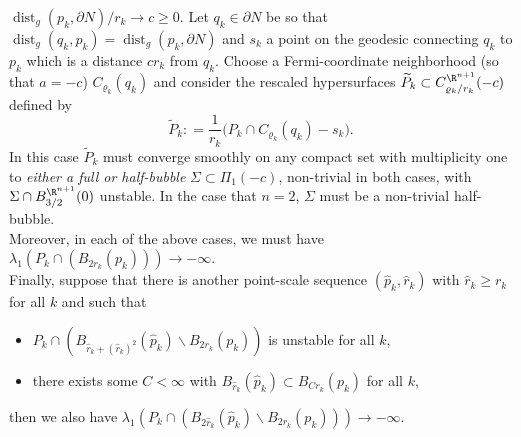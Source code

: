 \begin{thm}
        	 		 $\operatorname{dist}_g(p_k,\partial N)/r_k\to c\geqslant 0$. Let $q_k\in\partial N$ be so that $\operatorname{dist}_g(q_k,p_k)=\operatorname{dist}_g(p_k,\partial N)$ and $s_k$ a point on the geodesic connecting $q_k$ to $p_k$ which is a distance $cr_k$ from $q_k$. Choose a Fermi-coordinate neighborhood (so that $a=-c$) $C_{\varrho_k}(q_k)$ and consider the rescaled hypersurfaces $\widetilde{P}_k \subset C^{\R^{n+1}}_{\varrho_k/r_k}(-c)$ defined by
        	 		\begin{equation*}
        	 		\widetilde{P}_k  : = \frac{1}{r_k} \big(P_k\cap C_{\varrho_k}(q_k)- s_k\big).
        	 		\end{equation*}   In this case $\widetilde{P}_k$ must converge smoothly on any compact set with multiplicity one to \emph{either a full or half-bubble} $\Sigma\subset \Pi_1(-c)$, non-trivial in both cases, with $\Sigma\cap B^{\R^{n+1}}_{3/2}(0)$ unstable. %
        	 		In the case that $n=2$, $\Sigma$ must be a non-trivial half-bubble. \\ 	
        	 		Moreover, in each of the above cases, we must have $\lambda_1(P_k \cap (B_{2r_k}(p_k)))\to -\infty$. \\
        	 		
        	 		
        	 		Finally, suppose that there is another point-scale sequence $(\widehat{p}_k, \widehat{r}_k)$ with $\widehat{r}_k \geqslant r_k$ for all $k$ and such that
        	 		\begin{itemize}
        	 			\item $P_k\cap (B_{\widehat{r}_k+ (\widehat{r}_k)^2}(\widehat{p}_k)\smallsetminus B_{2r_k}(p_k))$ is unstable for all $k$,
        	 			\item there exists some $C<\infty$ with $B_{\widehat{r}_k}(\widehat{p}_k)\subset B_{Cr_k}(p_k)$ for all $k$,
        	 		\end{itemize}
        	 		then we also have $\lambda_1(P_k\cap (B_{2\widehat{r}_k}(\widehat{p}_k)\smallsetminus B_{2r_k}(p_k))) \to -\infty$.
        	 	\end{thm}
